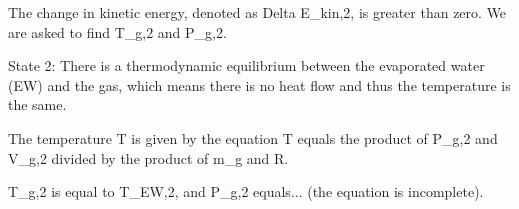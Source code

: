 The change in kinetic energy, denoted as Delta E_kin,2, is greater than zero. We are asked to find T_g,2 and P_g,2.

State 2: There is a thermodynamic equilibrium between the evaporated water (EW) and the gas, which means there is no heat flow and thus the temperature is the same.

The temperature T is given by the equation T equals the product of P_g,2 and V_g,2 divided by the product of m_g and R.

T_g,2 is equal to T_EW,2, and P_g,2 equals... (the equation is incomplete).